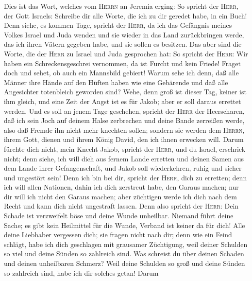  Dies ist das Wort, welches vom \textsc{Herrn} an Jeremia
erging:  So spricht der \textsc{Herr}, der Gott Israels:
Schreibe dir alle Worte, die ich zu dir geredet habe, in ein Buch!
 Denn siehe, es kommen Tage, spricht der \textsc{Herr}, da
ich das Gefängnis meines Volkes Israel und Juda wenden und sie wieder in
das Land zurückbringen werde, das ich ihren Vätern gegeben habe, und sie
sollen es besitzen.  Das aber sind die Worte, die der
\textsc{Herr} zu Israel und Juda gesprochen hat:  So
spricht der \textsc{Herr}: Wir haben ein Schreckensgeschrei vernommen,
da ist Furcht und kein Friede!  Fraget doch und sehet, ob
auch ein Mannsbild gebiert! Warum sehe ich denn, daß alle Männer ihre
Hände auf den Hüften haben wie eine Gebärende und daß alle Angesichter
totenbleich geworden sind?  Wehe, denn groß ist dieser
Tag, keiner ist ihm gleich, und eine Zeit der Angst ist es für Jakob;
aber er soll daraus errettet werden.  Und es soll an jenem
Tage geschehen, spricht der \textsc{Herr} der Heerscharen, daß ich sein
Joch auf deinem Halse zerbrechen und deine Bande zerreißen werde, also
daß Fremde ihn nicht mehr knechten sollen;  sondern sie
werden dem \textsc{Herrn}, ihrem Gott, dienen und ihrem König David, den
ich ihnen erwecken will.  Darum fürchte dich nicht, mein
Knecht Jakob, spricht der \textsc{Herr}, und du Israel, erschrick nicht;
denn siehe, ich will dich aus fernem Lande erretten und deinen Samen aus
dem Lande ihrer Gefangenschaft, und Jakob soll wiederkehren, ruhig und
sicher und ungestört sein!  Denn ich bin bei dir, spricht
der \textsc{Herr}, dich zu erretten; denn ich will allen Nationen, dahin
ich dich zerstreut habe, den Garaus machen; nur dir will ich nicht den
Garaus machen; aber züchtigen werde ich dich nach dem Recht und kann
dich nicht ungestraft lassen.  Denn also spricht der
\textsc{Herr}: Dein Schade ist verzweifelt böse und deine Wunde
unheilbar.  Niemand führt deine Sache; es gibt kein
Heilmittel für die Wunde, Verband ist keiner da für dich!
 Alle deine Liebhaber vergessen dich; sie fragen nicht
nach dir; denn wie ein Feind schlägt, habe ich dich geschlagen mit
grausamer Züchtigung, weil deiner Schulden so viel und deine Sünden so
zahlreich sind.  Was schreist du über deinen Schaden und
deinen unheilbaren Schmerz? Weil deine Schulden so groß und deine Sünden
so zahlreich sind, habe ich dir solches getan!  Darum
